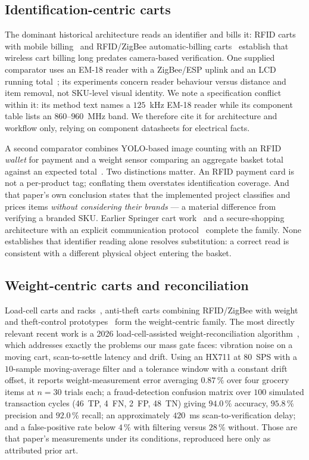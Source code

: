 \documentclass[conference]{IEEEtran}
\begin{document}
\subsection{Identification-centric carts}
The dominant historical architecture reads an identifier and bills it: RFID carts with mobile
billing~\cite{R10} and RFID/ZigBee automatic-billing carts~\cite{R18} establish that wireless cart
billing long predates camera-based verification. One supplied comparator uses an EM-18 reader with a
ZigBee/ESP uplink and an LCD running total~\cite{R11}; its experiments concern reader behaviour versus
distance and item removal, not SKU-level visual identity. We note a specification conflict within it:
its method text names a $125$~kHz EM-18 reader while its component table lists an $860$--$960$~MHz
band. We therefore cite it for architecture and workflow only, relying on component datasheets for
electrical facts.

A second comparator combines YOLO-based image counting with an RFID \emph{wallet} for payment and a
weight sensor comparing an aggregate basket total against an expected total~\cite{R12}. Two
distinctions matter. An RFID payment card is not a per-product tag; conflating them overstates
identification coverage. And that paper's own conclusion states that the implemented project
classifies and prices items \emph{without considering their brands} --- a material difference from
verifying a branded SKU. Earlier Springer cart work~\cite{R83} and a secure-shopping architecture with
an explicit communication protocol~\cite{R06} complete the family. None establishes that identifier
reading alone resolves substitution: a correct read is consistent with a different physical object
entering the basket.

\subsection{Weight-centric carts and reconciliation}
Load-cell carts and racks~\cite{R47}, anti-theft carts combining RFID/ZigBee with weight~\cite{R48}
and theft-control prototypes~\cite{R17} form the weight-centric family. The most directly relevant
recent work is a 2026 load-cell-assisted weight-reconciliation algorithm~\cite{R02}, which addresses
exactly the problems our mass gate faces: vibration noise on a moving cart, scan-to-settle latency and
drift. Using an HX711 at $80$~SPS with a $10$-sample moving-average filter and a tolerance window
with a constant drift offset, it reports weight-measurement error averaging $0.87\,\%$ over four
grocery items at $n=30$ trials each; a fraud-detection confusion matrix over $100$ simulated
transaction cycles (46~TP, 4~FN, 2~FP, 48~TN) giving $94.0\,\%$ accuracy, $95.8\,\%$ precision and
$92.0\,\%$ recall; an approximately $420$~ms scan-to-verification delay; and a false-positive rate
below $4\,\%$ with filtering versus $28\,\%$ without. Those are that paper's measurements under its
conditions, reproduced here only as attributed prior art.
\end{document}
